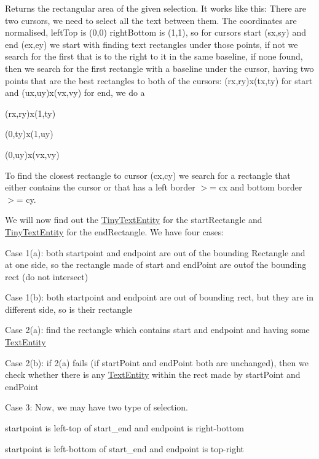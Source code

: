 Returns the rectangular area of the given {\ttfamily selection}. It works like this\+: There are two cursors, we need to select all the text between them. The coordinates are normalised, left\+Top is (0,0) right\+Bottom is (1,1), so for cursors start (sx,sy) and end (ex,ey) we start with finding text rectangles under those points, if not we search for the first that is to the right to it in the same baseline, if none found, then we search for the first rectangle with a baseline under the cursor, having two points that are the best rectangles to both of the cursors\+: (rx,ry)x(tx,ty) for start and (ux,uy)x(vx,vy) for end, we do a
\begin{DoxyEnumerate}
\item (rx,ry)x(1,ty)
\item (0,ty)x(1,uy)
\item (0,uy)x(vx,vy)
\end{DoxyEnumerate}

To find the closest rectangle to cursor (cx,cy) we search for a rectangle that either contains the cursor or that has a left border $>$= cx and bottom border $>$= cy.

We will now find out the \hyperlink{classTinyTextEntity}{Tiny\+Text\+Entity} for the start\+Rectangle and \hyperlink{classTinyTextEntity}{Tiny\+Text\+Entity} for the end\+Rectangle. We have four cases\+:

Case 1(a)\+: both startpoint and endpoint are out of the bounding Rectangle and at one side, so the rectangle made of start and end\+Point are outof the bounding rect (do not intersect)

Case 1(b)\+: both startpoint and endpoint are out of bounding rect, but they are in different side, so is their rectangle

Case 2(a)\+: find the rectangle which contains start and endpoint and having some \hyperlink{classOkular_1_1TextEntity}{Text\+Entity}

Case 2(b)\+: if 2(a) fails (if start\+Point and end\+Point both are unchanged), then we check whether there is any \hyperlink{classOkular_1_1TextEntity}{Text\+Entity} within the rect made by start\+Point and end\+Point

Case 3\+: Now, we may have two type of selection.
\begin{DoxyEnumerate}
\item startpoint is left-\/top of start\+\_\+end and endpoint is right-\/bottom
\item startpoint is left-\/bottom of start\+\_\+end and endpoint is top-\/right
\end{DoxyEnumerate}

